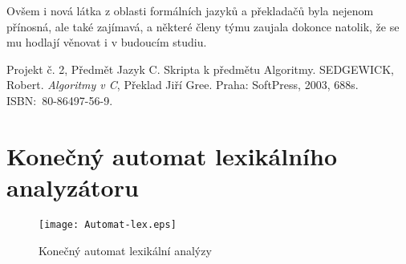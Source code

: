 \documentclass[12pt,a4paper]{article}
\begin{document}
Ovšem i nová látka z oblasti formálních jazyků a překladačů byla nejenom přínosná, ale také zajímavá, a některé členy týmu zaujala dokonce natolik, že se mu hodlají věnovat i v budoucím studiu. 

\begin{thebibliography}{56}


Projekt č. 2, Předmět Jazyk C.
Skripta k předmětu Algoritmy.
SEDGEWICK, Robert. \emph{Algoritmy v C}, Překlad Jiří Gree. Praha: SoftPress, 2003, 688s. ISBN:~80-86497-56-9.

\end{thebibliography}
\appendix
\section{Konečný automat lexikálního analyzátoru}
\begin{figure}[H]
    \centering
    \texttt{[image: Automat-lex.eps]}
    \caption{Konečný automat lexikální analýzy}
    \label{fig:lex_automat}
\end{figure}
\end{document}
